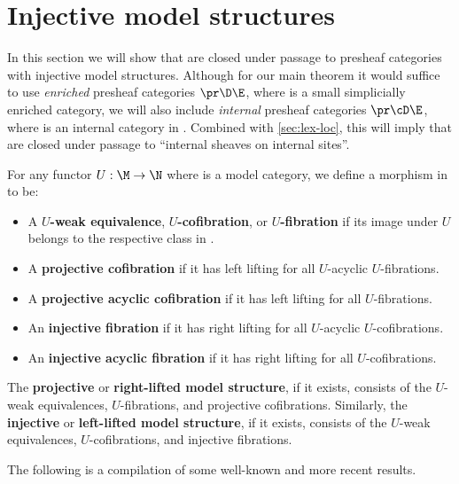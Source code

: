 \section{Injective model structures}
\label{sec:injmodel}

In this section we will show that \ttmts are closed under passage to presheaf categories with injective model structures.
Although for our main theorem it would suffice to use \emph{enriched} presheaf categories $\pr\D\E$, %
where \D is a small simplicially enriched category, we will also include \emph{internal} presheaf categories $\pr\cD\E$, where \cD is an internal category in \E.
Combined with \cref{sec:lex-loc}, this will imply that \ttmts are closed under passage to ``internal sheaves on internal sites''.

\begin{defn}
  For any functor $U:\M\to\N$ where \N is a model category, we define a morphism in \M to be:
  \begin{itemize}
  \item A \textbf{$U$-weak equivalence}, \textbf{$U$-cofibration}, or \textbf{$U$-fibration} if its image under $U$ belongs to the respective class in \N.
  \item A \textbf{projective cofibration} if it has left lifting for all $U$-acyclic $U$-fibrations.
  \item A \textbf{projective acyclic cofibration} if it has left lifting for all $U$-fibrations.
  \item An \textbf{injective fibration} if it has right lifting for all $U$-acyclic $U$-cofibrations.
  \item An \textbf{injective acyclic fibration} if it has right lifting for all $U$-cofibrations.
  \end{itemize}
  The \textbf{projective} or \textbf{right-lifted model structure}, if it exists, consists of the $U$-weak equivalences, $U$-fibrations, and projective cofibrations.
  Similarly, the \textbf{injective} or \textbf{left-lifted model structure}, if it exists, consists of the $U$-weak equivalences, $U$-cofibrations, and injective fibrations.
\end{defn}

The following is a compilation of some well-known and more recent results.

